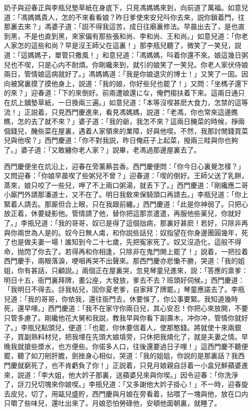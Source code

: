 奶子與迎春正與李瓶兒墊草紙在身底下，只見馮媽媽來到，向前道了萬福。如意兒道：「馮媽媽貴人，怎的不來看看娘？昨日爹使來安兒呌你去來，説你鎖着門，往那裏去來？」馮婆子道：「説不得我這苦，成日往廟裏修法。早晨出去了，是也直到黑，不是也直到黑，來家偏有那些張和尚、李和尚、王和尚。」如意兒道：「你老人家怎的這些和尚？早是沒王師父在這裏！」那李瓶兒聽了，微笑了一笑兒，説道：「這媽媽子，單管只撒風！」和意兒道：「馮媽媽，呌着你還不來。娘這幾日粥兒也不喫，只是心内不耐煩。你剛纔來到，就引的娘笑了一笑兒。你老人家伏侍娘兩日，管情娘這病就好了。」馮媽媽道：「我是你娘退灾的博士！」又笑了一囬。因向被窝裏摸了摸他身上，説道：「我的娘，你好些兒也罷了！」又問：「坐榪子還下的來？」迎春道：「下的來倒好。前兩遭娘還にな，俺們搊扶着下來。這兩日通只在炕上舖墊草紙，一日換兩三遍。」如意兒道：「本等沒喫甚麽大食力，怎禁的這等流！」正説着，只見西門慶進來，看見馮媽媽，説道：「老馮，你也常來這邊瞧瞧，怎的去了就不來？」婆子道：「我的爺，我怎不來？這兩日醃菜的時候，掙兩個錢兒，醃些菜在屋裏，遇着人家領來的業障，好與他喫。不然，我那討閒錢買菜兒與他喫？」西門慶道：「你不對我説，昨日俺莊子上起菜，撥兩三畦與你也夠了。」婆子道：「又敢纏你老人家？」説畢，老馮過那邊屋裏去了。

西門慶便坐在炕沿上，迎春在旁薰爇芸香。西門慶便問：「你今日心裏覺怎樣？」又問迎春：「你娘早晨喫了些粥兒不曾？」迎春道：「喫的倒好。王師父送了乳餅，蒸來，娘只咬了一些兒，呷了不上兩口粥湯，就丢下了。」西門慶道：「剛纔應二哥小廝門外請那潘道士，又不在了。明日我敎來保騎頭口再請去。」李瓶兒道：「你上緊着人請去。那廝但合上眼，只在我跟前纏。」西門慶道：「此是你神弱了。只把心放正着，休要疑影他。管情請了他，替你把這那祟遣遣，再服他些薬兒，你就好了。」李瓶兒道：「我的哥哥，奴已是得了這個拙病，那裏好甚麽！若好，只除非再與你兩世為人是的。奴今日無人䖏，和你説些話兒：奴指望在你身邊團圓幾年，死了也是做夫妻一場！誰知到今二十七歲，先把寃家死了。奴又沒造化，這般不得命，抛閃了你去了。若得再和你相逢，只除非在鬼門関上罷了！」説着，一把拉着西門慶手，兩眼落淚，哽咽再哭不出聲來。那西門慶亦悲慟不勝，哭道：「我的姐姐，你有甚話，只顧説。」兩個正在屋裏哭，忽見琴童兒進來，説：「答應的禀爹：明日十五，衙門裏拜牌，畫公座，大發放，爹去不去？班頭好伺候。」西門慶道：「我明日不得去。㧱我帖兒，囬你夏老爹，自家拜了牌罷。」琴童應諾去了。李瓶兒道：「我的哥哥，你依我，還往衙門去，休要悞了，你公事要緊。我知道幾時死，還早哩。」西門慶道：「我不在家守你兩日兒，其心安忍！你把心來放開，不要只管多慮了。剛纔他花大舅和我説，教我早與你看下副壽木，冲你冲，管情你就好了。」李瓶兒點頭兒，便道：「也罷，你休要信着人，使那憨錢。將就使十來兩銀子，買副熟料材兒，把我埋在先頭大娘墳旁，只休把我燒化了，就是夫妻之情。早晚我就搶些漿水，也方便些。你偌多人口，往後還要過日子哩！」這西門慶不聽便罷，聽了如刀剜肝膽，劍挫身心相似，哭道：「我的姐姐，你説的是那裏話？我西門慶就窮死了，也不肯虧負了你！」正説着，只見月娘親自㧱着一小盒兒鮮蘋婆進來，説道：「李大姐，他大妗子那裏，送蘋婆兒來與你喫。」因令迎春：「你洗淨了，㧱刀兒切塊來你娘喫。」李瓶兒道：「又多謝他大妗子掛心！」不一時，迎春旋去皮兒，切了，用甌兒盛貯，西門慶與月娘在旁看着，拈喂了一塊與他，放在口内只嚼了些味兒，還吐出來了。月娘恐怕勞碌他，安頓他面朝裏，就睡了。

